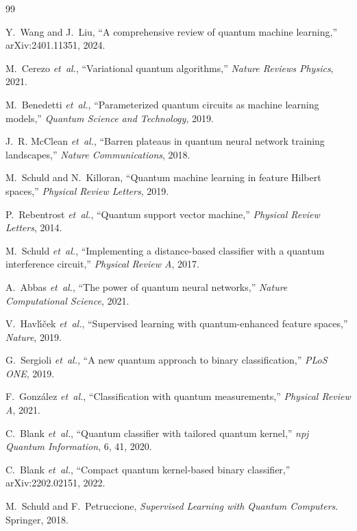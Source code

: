 \documentclass[conference]{IEEEtran}
\begin{document}

\begin{thebibliography}{99}

Y.~Wang and J.~Liu, ``A comprehensive review of quantum machine learning,'' arXiv:2401.11351, 2024.

M.~Cerezo \emph{et~al.}, ``Variational quantum algorithms,'' \emph{Nature Reviews Physics}, 2021.

M.~Benedetti \emph{et~al.}, ``Parameterized quantum circuits as machine learning models,'' \emph{Quantum Science and Technology}, 2019.

J.~R. McClean \emph{et~al.}, ``Barren plateaus in quantum neural network training landscapes,'' \emph{Nature Communications}, 2018.

M.~Schuld and N.~Killoran, ``Quantum machine learning in feature Hilbert spaces,'' \emph{Physical Review Letters}, 2019.

P.~Rebentrost \emph{et~al.}, ``Quantum support vector machine,'' \emph{Physical Review Letters}, 2014.

M.~Schuld \emph{et~al.}, ``Implementing a distance-based classifier with a quantum interference circuit,'' \emph{Physical Review A}, 2017.

A.~Abbas \emph{et~al.}, ``The power of quantum neural networks,'' \emph{Nature Computational Science}, 2021.

V.~Havl\'{\i}\v{c}ek \emph{et~al.}, ``Supervised learning with quantum-enhanced feature spaces,'' \emph{Nature}, 2019.

G.~Sergioli \emph{et~al.}, ``A new quantum approach to binary classification,'' \emph{PLoS ONE}, 2019.

F.~Gonz\'alez \emph{et~al.}, ``Classification with quantum measurements,'' \emph{Physical Review A}, 2021.

C.~Blank \emph{et~al.}, ``Quantum classifier with tailored quantum kernel,'' \emph{npj Quantum Information}, 6, 41, 2020.

C.~Blank \emph{et~al.}, ``Compact quantum kernel-based binary classifier,'' arXiv:2202.02151, 2022.

M.~Schuld and F.~Petruccione, \emph{Supervised Learning with Quantum Computers}. Springer, 2018.


\end{thebibliography}
\end{document}
